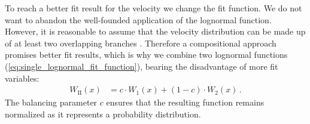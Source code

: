 To reach a better fit result for the velocity we change the fit function. We do not want to abandon the well-founded application of the lognormal function. However, it is reasonable to assume that the velocity distribution can be made up of at least two overlapping branches \citep{McGregor2011b}. Therefore a compositional approach promises better fit results, which is why we combine two lognormal functions (\ref{eq:single_lognormal_fit_function}), bearing the disadvantage of more fit variables:
\begin{align}
	W_\text{II}(x) &= c \cdot W_1(x) + (1 -c) \cdot W_2(x)\,.	\label{eq:double_lognormal_fit_function}
\end{align}
The balancing parameter $c$ ensures that the resulting function remains normalized as it represents a probability distribution.

